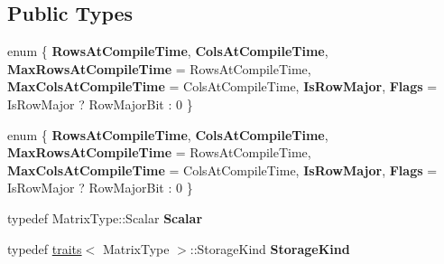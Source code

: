 \subsection*{Public Types}
\begin{DoxyCompactItemize}
\item 
\mbox{\label{struct_eigen_1_1internal_1_1traits_3_01_replicate_3_01_matrix_type_00_01_row_factor_00_01_col_factor_01_4_01_4_a026695bc838dd9aef88816c513faa1b3}} 
enum \{ \newline
{\bfseries Rows\+At\+Compile\+Time}, 
{\bfseries Cols\+At\+Compile\+Time}, 
{\bfseries Max\+Rows\+At\+Compile\+Time} = Rows\+At\+Compile\+Time, 
{\bfseries Max\+Cols\+At\+Compile\+Time} = Cols\+At\+Compile\+Time, 
\newline
{\bfseries Is\+Row\+Major}, 
{\bfseries Flags} = Is\+Row\+Major ? Row\+Major\+Bit \+: 0
 \}
\item 
\mbox{\label{struct_eigen_1_1internal_1_1traits_3_01_replicate_3_01_matrix_type_00_01_row_factor_00_01_col_factor_01_4_01_4_ac1e7af469ec21913caa322c56e79cd9d}} 
enum \{ \newline
{\bfseries Rows\+At\+Compile\+Time}, 
{\bfseries Cols\+At\+Compile\+Time}, 
{\bfseries Max\+Rows\+At\+Compile\+Time} = Rows\+At\+Compile\+Time, 
{\bfseries Max\+Cols\+At\+Compile\+Time} = Cols\+At\+Compile\+Time, 
\newline
{\bfseries Is\+Row\+Major}, 
{\bfseries Flags} = Is\+Row\+Major ? Row\+Major\+Bit \+: 0
 \}
\item 
\mbox{\label{struct_eigen_1_1internal_1_1traits_3_01_replicate_3_01_matrix_type_00_01_row_factor_00_01_col_factor_01_4_01_4_abc7e2bd9b52486df3c210a519b8b5ab6}} 
typedef Matrix\+Type\+::\+Scalar {\bfseries Scalar}
\item 
\mbox{\label{struct_eigen_1_1internal_1_1traits_3_01_replicate_3_01_matrix_type_00_01_row_factor_00_01_col_factor_01_4_01_4_a897e1e1f1b3bf8a29a9f193eb2b123f2}} 
typedef \hyperlink{struct_eigen_1_1internal_1_1traits}{traits}$<$ Matrix\+Type $>$\+::Storage\+Kind {\bfseries Storage\+Kind}

\end{DoxyCompactItemize}
